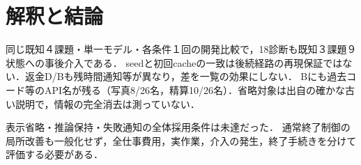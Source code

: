 \documentclass[letter]{ieicej}
\begin{document}



\section{解釈と結論}
同じ既知４課題・単一モデル・各条件１回の開発比較で，18診断も既知３課題９状態への事後介入である．
seedと初回cacheの一致は後続経路の再現保証ではない．返金D/Bも残時間通知等が異なり，差を一覧の効果にしない．
Bにも過去コード等のAPI名が残る（写真8/26名，精算10/26名）．省略対象は出自の確かな古い説明で，情報の完全消去は測っていない．

表示省略・推論保持・失敗通知の全体採用条件は未達だった．
通常終了制御の局所改善も一般化せず，全仕事費用，実作業，介入の発生，終了手続きを分けて評価する必要がある．



\label{PreviewLastBodyPage}
\end{document}
